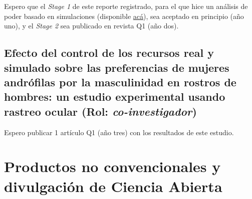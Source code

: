 \documentclass[11pt,a4paper,]{awesome-cv}
\begin{document}
\begin{footnotesize}

Espero que el \textit{Stage 1} de este reporte registrado, para el que hice un análisis de poder basado en simulaciones (disponible \href{https://github.com/comp-music-lab/VisualEars/blob/main/Power_Analysis/Power_analysis.pdf}{acá}), sea aceptado en principio (año uno), y el \textit{Stage 2} sea publicado en revista Q1 (año dos).

\end{footnotesize}

\hypertarget{efecto-del-control-de-los-recursos-real-y-simulado-sobre-las-preferencias-de-mujeres-andruxf3filas-por-la-masculinidad-en-rostros-de-hombres-un-estudio-experimental-usando-rastreo-ocular-rol-co-investigador}{%
\subsection{\texorpdfstring{Efecto del control de los recursos real y
simulado sobre las preferencias de mujeres andrófilas por la
masculinidad en rostros de hombres: un estudio experimental usando
rastreo ocular (Rol:
\emph{co-investigador})}{Efecto del control de los recursos real y simulado sobre las preferencias de mujeres andrófilas por la masculinidad en rostros de hombres: un estudio experimental usando rastreo ocular (Rol: co-investigador)}}\label{efecto-del-control-de-los-recursos-real-y-simulado-sobre-las-preferencias-de-mujeres-andruxf3filas-por-la-masculinidad-en-rostros-de-hombres-un-estudio-experimental-usando-rastreo-ocular-rol-co-investigador}}

\begin{footnotesize}

Espero publicar 1 artículo Q1 (año tres) con los resultados de este estudio.

\end{footnotesize}

\hypertarget{productos-no-convencionales-y-divulgaciuxf3n-de-ciencia-abierta}{%
\section{Productos no convencionales y divulgación de Ciencia
Abierta}\label{productos-no-convencionales-y-divulgaciuxf3n-de-ciencia-abierta}}
\end{document}
